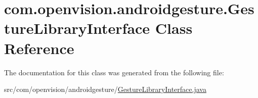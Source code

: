 \hypertarget{classcom_1_1openvision_1_1androidgesture_1_1_gesture_library_interface}{\section{com.\-openvision.\-androidgesture.\-Gesture\-Library\-Interface \-Class \-Reference}
\label{classcom_1_1openvision_1_1androidgesture_1_1_gesture_library_interface}
}


\-The documentation for this class was generated from the following file\-:\begin{DoxyCompactItemize}
\item 
src/com/openvision/androidgesture/\hyperlink{_gesture_library_interface_8java}{\-Gesture\-Library\-Interface.\-java}\end{DoxyCompactItemize}
